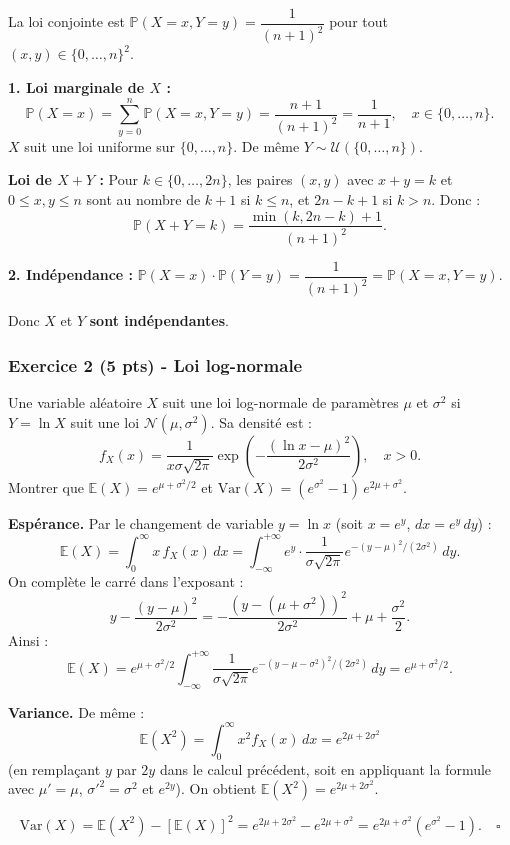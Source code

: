 \documentclass[12pt,a4paper]{article}
\begin{document}
\begin{boitecorrige}
La loi conjointe est $\mathbb{P}(X=x, Y=y) = \dfrac{1}{(n+1)^2}$ pour tout $(x,y)\in\{0,\ldots,n\}^2$.

\textbf{1. Loi marginale de $X$ :}
\[
\mathbb{P}(X=x) = \sum_{y=0}^n \mathbb{P}(X=x,Y=y) = \frac{n+1}{(n+1)^2} = \frac{1}{n+1}, \quad x\in\{0,\ldots,n\}.
\]
$X$ suit une loi uniforme sur $\{0,\ldots,n\}$. De même $Y\sim\mathcal{U}(\{0,\ldots,n\})$.

\textbf{Loi de $X+Y$ :} Pour $k\in\{0,\ldots,2n\}$, les paires $(x,y)$ avec $x+y=k$ et $0\leq x,y\leq n$ sont au nombre de $k+1$ si $k\leq n$, et $2n-k+1$ si $k>n$. Donc :
\[
\mathbb{P}(X+Y=k) = \frac{\min(k,2n-k)+1}{(n+1)^2}.
\]

\textbf{2. Indépendance :}
$\mathbb{P}(X=x)\cdot\mathbb{P}(Y=y) = \dfrac{1}{(n+1)^2} = \mathbb{P}(X=x,Y=y)$.

Donc $X$ et $Y$ \textbf{sont indépendantes}.
\end{boitecorrige}

\subsubsection*{Exercice 2 (5 pts) - Loi log-normale \niveau{\difficile}}

\begin{boiteexercice}
Une variable aléatoire $X$ suit une loi log-normale de paramètres $\mu$ et $\sigma^2$ si $Y = \ln X$ suit une loi $\mathcal{N}(\mu, \sigma^2)$. Sa densité est :
\[
f_X(x) = \frac{1}{x\sigma\sqrt{2\pi}}\exp\!\left(-\frac{(\ln x - \mu)^2}{2\sigma^2}\right), \quad x > 0.
\]
Montrer que $\mathbb{E}(X) = e^{\mu+\sigma^2/2}$ et $\mathrm{Var}(X) = (e^{\sigma^2}-1)\,e^{2\mu+\sigma^2}$.
\end{boiteexercice}

\begin{boitecorrige}
\textbf{Espérance.} Par le changement de variable $y = \ln x$ (soit $x = e^y$, $dx = e^y\,dy$) :
\[
\mathbb{E}(X) = \int_0^\infty x\,f_X(x)\,dx
= \int_{-\infty}^{+\infty} e^y \cdot \frac{1}{\sigma\sqrt{2\pi}}e^{-(y-\mu)^2/(2\sigma^2)}\,dy.
\]
On complète le carré dans l'exposant :
\[
y - \frac{(y-\mu)^2}{2\sigma^2} = -\frac{(y-(\mu+\sigma^2))^2}{2\sigma^2} + \mu + \frac{\sigma^2}{2}.
\]
Ainsi :
\[
\mathbb{E}(X) = e^{\mu+\sigma^2/2}\int_{-\infty}^{+\infty}\frac{1}{\sigma\sqrt{2\pi}}e^{-(y-\mu-\sigma^2)^2/(2\sigma^2)}\,dy = \boxed{e^{\mu+\sigma^2/2}}.
\]

\textbf{Variance.} De même :
\[
\mathbb{E}(X^2) = \int_0^\infty x^2 f_X(x)\,dx = e^{2\mu+2\sigma^2}
\]
(en remplaçant $y$ par $2y$ dans le calcul précédent, soit en appliquant la formule avec $\mu' = \mu$, $\sigma'^2 = \sigma^2$ et $e^{2y}$). On obtient $\mathbb{E}(X^2) = e^{2\mu+2\sigma^2}$.

\[
\mathrm{Var}(X) = \mathbb{E}(X^2) - [\mathbb{E}(X)]^2 = e^{2\mu+2\sigma^2} - e^{2\mu+\sigma^2}
= e^{2\mu+\sigma^2}(e^{\sigma^2}-1). \quad \square
\]
\end{boitecorrige}
\end{document}
